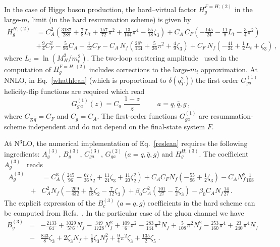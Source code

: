 \documentclass[12pt]{article}
\def\beeq{\begin{eqnarray}}
\def\eeeq{\end{eqnarray}}
\def\nn{\nonumber}
\newcommand\f[2]{\frac{#1}{#2}}
\DeclareRobustCommand{\qt}{q_T}
\begin{document}
In the case of Higgs boson production, the hard--virtual factor $H^{F=H;(2)}_{g}$ in the large-$m_t$ limit (in the hard resummation scheme) is given by~\cite{Catani:2011kr}
\begin{align}
\label{H2g}
H_g^{H;(2)}&=C_A^2\left(
\f{3187}{288}+\f{7}{8}L_t+\f{157}{72}\pi^2+\f{13}{144}\pi^4-\f{55}{18}\zeta_3\right)+C_A\, C_F\left(-\f{145}{24}-\f{11}{8}L_t-\f{3}{4}\pi^2\right)\nn\\
&+\f{9}{4}C_F^2
-\f{5}{96}C_A-\f{1}{12}C_F-C_A\, N_f\left(\f{287}{144}+\f{5}{36}\pi^2+\f{4}{9}\zeta_3\right)
+C_F\, N_f\left(-\f{41}{24}+\f{1}{2}L_t+\zeta_3\right)\, ,
\end{align}
where $L_t=\ln (M_H^2/m_t^2)$. The two-loop scattering amplitude~\cite{Harlander:2009bw}  used in the computation of  $H^{F=H;(2)}_{g}$ includes corrections to the large-$m_t$ approximation.
At NNLO, in Eq.~\eqref{whathlean} (which is proportional to $\delta(\qt^{2})$) the first order $G_{ga}^{(1)}$ helicity-flip functions are required which read~\cite{Catani:2010pd}
\begin{equation}
G_{g \,a}^{(1)}(z) = C_a \;\f{1-z}{z}~~~~~~~~~~~a=q,\bar{q},g\, ,
\end{equation}
where $C_{q;\bar{q}}=C_{F}$ and $C_g=C_{A}$. The first-order functions $G_{ga}^{(1)}$ are resummation-scheme independent and do not depend on the final-state system $F$.

At N$^{3}$LO, the numerical implementation of Eq.~\eqref{reslean} requires the following ingredients: $A^{(3)}_{g}$, $B^{(3)}_{g}$, $C^{(3)}_{ga}$, $G^{(2)}_{ga}$ ($a=q,{\bar q},g$) and $H^{H;(3)}_{g}$. The coefficient $A_g^{(3)}$~\cite{Becher:2010tm} reads
\beeq
\label{acoeff}
A_g^{(3)}\!\!\!&&\!\!\!\!\!\!\!\!  =  C_A^3 \left( \frac{245}{96} - \frac{67}{36}\zeta_2
 + \frac{11}{24}\zeta_3 + \frac{11}{20}\zeta_2^2\right) 
 + C_A C_F N_f \left(-\frac{55}{96} + \frac{1}{2}\zeta_3\right)
 - C_A N_f^2 \frac{1}{108} \nn\\
 &+& \!\!C_A^2 N_f \left(-\frac{209}{432} + \frac{5}{18}\zeta_2 - \frac{7}{12} \zeta_3\right)  
 + \beta_{0} C_A^2\left(\frac{101}{27}-\frac{7}{2}\zeta_{3}\right)- \beta_{0} C_A N_f \frac{14}{27}\,.
\eeeq
The explicit expression of the $B_c^{(3)}$ ($a=q,g$) coefficients in the hard scheme can be computed from Refs.~\cite{Li:2016ctv,Vladimirov:2016dll}. In the particular case of the gluon channel we have
\beeq
B_g^{(3)}&=& - \f{2133}{64} +  \f{3029}{576} N_{f} - \f{349}{1728} N_{f}^{2}  + \f{109}{6} \pi^{2} - \f{283}{144} \pi^{2}  N_{f} + \f{5}{108} \pi^{2}  N_{f}^{2}-\f{253}{160} \pi^{4}+\f{23}{240} \pi^{4} N_{f}\nn\\
&-& \f{843}{8} \zeta_{3} + 2 \zeta_{3} N_{f} + \f{1}{6} \zeta_{3} N_{f}^{2} + \f{9}{4} \pi^{2}  \zeta_{3} + \f{135}{2}  \zeta_{5}\;.
\eeeq
\end{document}
